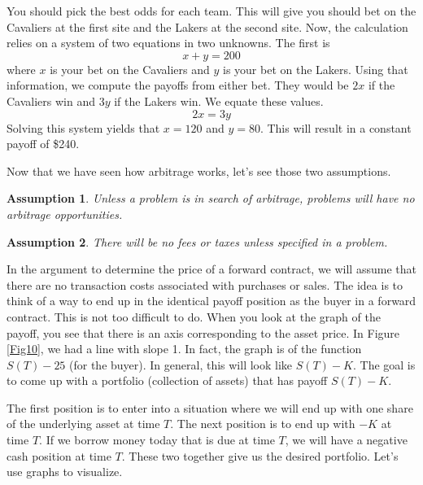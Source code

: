 \documentclass{ximera}
\newtheorem{ass}{Assumption}
\begin{document}
\begin{solution}
You should pick the best odds for each team. This will give you should bet on the Cavaliers at the first site and the Lakers at the second site. Now, the calculation relies on a system of two equations in two unknowns. The first is
	\begin{equation*}
	x+y=200
	\end{equation*}
where $x$ is your bet on the Cavaliers and $y$ is your bet on the Lakers. Using that information, we compute the payoffs from either bet. They would be $2x$ if the Cavaliers win and $3y$ if the Lakers win. We equate these values.
	\begin{equation*}
	2x=3y
	\end{equation*}
Solving this system yields that $x=120$ and $y=80$. This will result in a constant payoff of \$240.
\end{solution}

Now that we have seen how arbitrage works, let's see those two assumptions.

\begin{ass}\label{ass5} Unless a problem is in search of arbitrage, problems will have no arbitrage opportunities.
\end{ass}

\begin{ass}\label{ass6} There will be no fees or taxes unless specified in a problem.
\end{ass}

In the argument to determine the price of a forward contract, we will assume that there are no transaction costs associated with purchases or sales. The idea is to think of a way to end up in the identical payoff position as the buyer in a forward contract. This is not too difficult to do. When you look at the graph of the payoff, you see that there is an axis corresponding to the asset price. In Figure \ref{Fig10}, we had a line with slope 1. In fact, the graph is of the function $S(T)-25$ (for the buyer). In general, this will look like $S(T)-K$. The goal is to come up with a portfolio (collection of assets) that has payoff $S(T)-K$. 

The first position is to enter into a situation where we will end up with one share of the underlying asset at time $T$. The next position is to end up with $-K$ at time $T$. If we borrow money today that is due at time $T$, we will have a negative cash position at time $T$. These two together give us the desired portfolio. Let's use graphs to visualize.
\end{document}
